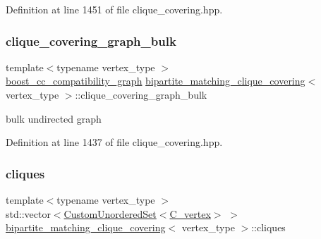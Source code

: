 Definition at line 1451 of file clique\+\_\+covering.\+hpp.

\mbox{\label{classbipartite__matching__clique__covering_a565ab2aa76a42faf6d911e6e2cba34c4}} 
\subsubsection{\texorpdfstring{clique\+\_\+covering\+\_\+graph\+\_\+bulk}{clique\_covering\_graph\_bulk}}
{\footnotesize\ttfamily template$<$typename vertex\+\_\+type $>$ \\
\hyperlink{clique__covering__graph_8hpp_af47b1c28cf9a2c360afafb8d80582ce6}{boost\+\_\+cc\+\_\+compatibility\+\_\+graph} \hyperlink{classbipartite__matching__clique__covering}{bipartite\+\_\+matching\+\_\+clique\+\_\+covering}$<$ vertex\+\_\+type $>$\+::clique\+\_\+covering\+\_\+graph\+\_\+bulk\hspace{0.3cm}{\ttfamily [private]}}



bulk undirected graph 



Definition at line 1437 of file clique\+\_\+covering.\+hpp.

\mbox{\label{classbipartite__matching__clique__covering_a3081b6c815f70097fa13c8953dfdf3d6}} 
\subsubsection{\texorpdfstring{cliques}{cliques}}
{\footnotesize\ttfamily template$<$typename vertex\+\_\+type $>$ \\
std\+::vector$<$\hyperlink{classCustomUnorderedSet}{Custom\+Unordered\+Set}$<$\hyperlink{clique__covering__graph_8hpp_a9cb45047ea8c5ed95a8cfa90494345aa}{C\+\_\+vertex}$>$ $>$ \hyperlink{classbipartite__matching__clique__covering}{bipartite\+\_\+matching\+\_\+clique\+\_\+covering}$<$ vertex\+\_\+type $>$\+::cliques\hspace{0.3cm}{\ttfamily [private]}}



